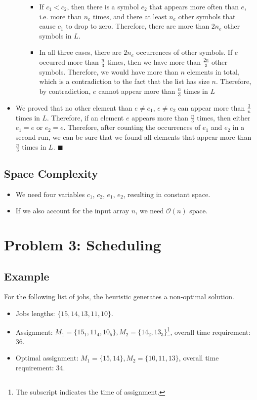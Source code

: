 \documentclass[12pt]{article}
\begin{document}
\begin{itemize}
\begin{itemize}
\begin{itemize}
			\item If $c_1 < c_2$, then there is a symbol $e_2$ that appears more often than $e$, i.e. more than $n_e$ times, and there at least $n_e$ other symbols that cause $c_1$ to drop to zero. Therefore, there are more than $2n_e$ other symbols in $L$.
			\item In all three cases, there are $2n_e$ occurrences of other symbols. If $e$ occurred more than $\frac{n}{3}$ times, then we have more than $\frac{2n}{3}$ other symbols. Therefore, we would have more than $n$ elements in total, which is a contradiction to the fact that the list has size $n$. Therefore, by contradiction, $e$ cannot appear more than $\frac{n}{3}$ times in $L$
		\end{itemize}
	\end{itemize}
	\item We proved that no other element than $e \not= e_1$, $e \not= e_2$ can appear more than $\frac{3}{n}$ times in $L$. Therefore, if an element $e$ appears more than $\frac{n}{3}$ times, then either $e_1=e$ or $e_2=e$. Therefore, after counting the occurrences of $e_1$ and $e_2$ in a second run, we can be sure that we found all elements that appear more than $\frac{n}{3}$ times in $L$. \hfill $\blacksquare$
\end{itemize}

\subsection*{Space Complexity}
\begin{itemize}
	\item We need four variables $c_1$, $c_2$, $e_1$, $e_2$, resulting in constant space.
	\item If we also account for the input array $n$, we need $\mathcal{O}(n)$ space.
\end{itemize}

\newpage
\section*{Problem 3: Scheduling}
\subsection*{Example}
For the following list of jobs, the heuristic generates a non-optimal solution.

\begin{itemize}
	\item Jobs lengths: $\{15, 14, 13, 11, 10\}$.
	\item Assignment: $M_1 = \{15_1, 11_4, 10_5\}, M_2 = \{14_2, 13_3\}$\footnote{The subscript indicates the time of assignment.}, overall time requirement: $36$.
	\item Optimal assignment: $M_1 = \{15, 14\}, M_2 = \{10, 11 , 13\}$, overall time requirement: $34$.
\end{itemize}
\end{document}
